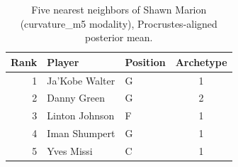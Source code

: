 \begin{table}[htbp]
  \centering\small
  \begin{tabular}{rllc}
    \toprule
    Rank & Player & Position & Archetype \\
    \midrule
    1 & Ja'Kobe Walter & G & 1 \\
    2 & Danny Green & G & 2 \\
    3 & Linton Johnson & F & 1 \\
    4 & Iman Shumpert & G & 1 \\
    5 & Yves Missi & C & 1 \\
    \bottomrule
  \end{tabular}
  \caption{Five nearest neighbors of Shawn Marion (curvature_m5 modality), Procrustes-aligned posterior mean.}
  \label{tab:Shawn_Marion_neighbors_curvature_m5}
\end{table}

